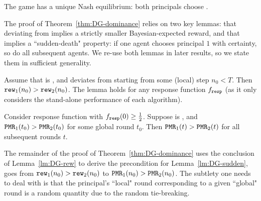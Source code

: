 

\begin{corollary}\label{cor:DG-dominance}
 The game has a unique Nash equilibrium: both principals choose \DynGreedy.
\end{corollary}

The proof of Theorem~\ref{thm:DG-dominance} relies on two key lemmas: that deviating from \DynGreedy implies a strictly smaller Bayesian-expected reward, and that \HardMax implies a ``sudden-death" property: if one agent chooses principal $1$ with certainty, so do all subsequent agents. We re-use both lemmas in later results, so we state them in sufficient generality. 



\begin{lemma}\label{lm:DG-rew}
Assume that \alg[1] is \DynGreedy, and \alg[2] deviates from \DynGreedy starting from some (local) step $n_0<T$. Then $\mathtt{rew}_1(n_0)>\mathtt{rew}_2(n_0)$. The lemma holds for any response function $f_{\mathtt{resp}}$ (as it only considers the stand-alone performance of each algorithm).
\end{lemma}


\begin{lemma}\label{lm:DG-sudden}
Consider \HardMax response function with $f_{\mathtt{resp}}(0)\geq\tfrac12$.
Suppose \alg[1] is \bmonotone, and $\mathtt{PMR}_1(t_0)>\mathtt{PMR}_2(t_0)$ for some global round $t_0$. Then $\mathtt{PMR}_1(t)>\mathtt{PMR}_2(t)$ for all subsequent rounds $t$.
\end{lemma}

The remainder of the proof of Theorem~\ref{thm:DG-dominance} uses the conclusion of Lemma~\ref{lm:DG-rew} to derive the precondition for Lemma~\ref{lm:DG-sudden}, \ie goes from $\mathtt{rew}_1(n_0)>\mathtt{rew}_2(n_0)$ to $\mathtt{PMR}_1(n_0)>\mathtt{PMR}_2(n_0)$. The subtlety one needs to deal with is that the principal's ``local" round corresponding to a given ``global" round is a random quantity due to the random tie-breaking.

